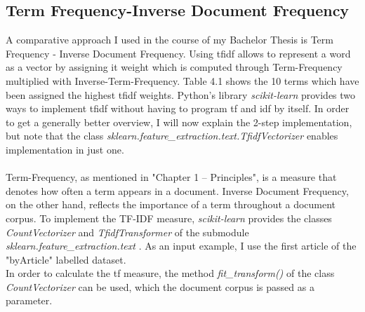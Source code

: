 \documentclass[a4paper, 11pt,titlepage,oneside,openany]{book}
\begin{document}
\subsection{Term Frequency-Inverse Document Frequency}
A comparative approach I used in the course of my Bachelor Thesis is Term Frequency - Inverse Document Frequency. Using \gls{tfidf} allows to represent a word as a vector by assigning it weight which is computed through Term-Frequency multiplied with Inverse-Term-Frequency. Table 4.1 shows the 10 terms which have been assigned the highest \gls{tfidf} weights. Python's library \textit{scikit-learn} \cite{scikit-learn} provides two ways to implement \gls{tfidf} without having to program \gls{tf} and \gls{idf} by itself.
In order to get a generally better overview, I will now explain the 2-step implementation, but note that the class \textit{sklearn.feature\_extraction.text.TfidfVectorizer} enables implementation in just one. \\
\\ Term-Frequency, as mentioned in "Chapter 1 -- Principles", is a measure that denotes how often a term appears in a document. Inverse Document Frequency, on the other hand, reflects the importance of a term throughout a document corpus. To implement the TF-IDF measure, \textit{scikit-learn} provides the classes \textit{CountVectorizer} and \textit{TfidfTransformer} of the submodule \textit{sklearn.feature\_extraction.text} \cite{tfidf}. As an input example, I use the first article of the "byArticle" labelled dataset. \\
\noindent In order to calculate the \gls{tf} measure, the method \textit{fit\_transform()} of the class \textit{CountVectorizer} can be used, which the document corpus is passed as a parameter. \\
\end{document}
